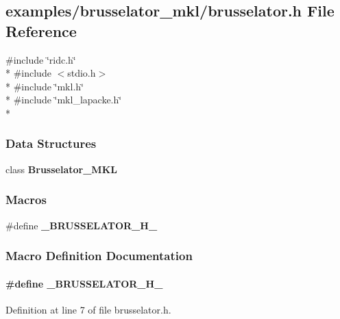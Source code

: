 \subsection{examples/brusselator\+\_\+mkl/brusselator.h File Reference}
\label{brusselator__mkl_2brusselator_8h}
{\ttfamily \#include \char`\"{}ridc.\+h\char`\"{}}\\*
{\ttfamily \#include $<$stdio.\+h$>$}\\*
{\ttfamily \#include \char`\"{}mkl.\+h\char`\"{}}\\*
{\ttfamily \#include \char`\"{}mkl\+\_\+lapacke.\+h\char`\"{}}\\*
\subsubsection*{Data Structures}
\begin{DoxyCompactItemize}
\item 
class {\bf Brusselator\+\_\+\+M\+K\+L}
\end{DoxyCompactItemize}
\subsubsection*{Macros}
\begin{DoxyCompactItemize}
\item 
\#define {\bf \+\_\+\+B\+R\+U\+S\+S\+E\+L\+A\+T\+O\+R\+\_\+\+H\+\_\+}
\end{DoxyCompactItemize}


\subsubsection{Macro Definition Documentation}
\paragraph[{\+\_\+\+B\+R\+U\+S\+S\+E\+L\+A\+T\+O\+R\+\_\+\+H\+\_\+}]{\setlength{\rightskip}{0pt plus 5cm}\#define \+\_\+\+B\+R\+U\+S\+S\+E\+L\+A\+T\+O\+R\+\_\+\+H\+\_\+}\label{brusselator__mkl_2brusselator_8h_a812147959eafc576a0f4ebed8ae4d0ca}


Definition at line 7 of file brusselator.\+h.

